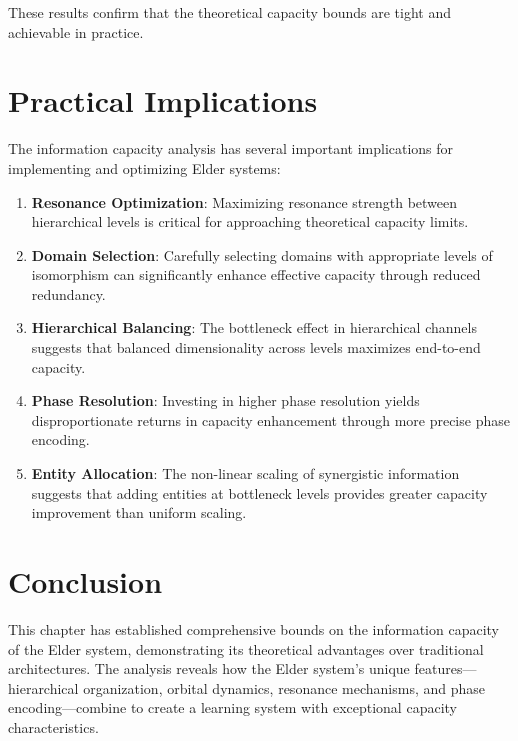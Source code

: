 These results confirm that the theoretical capacity bounds are tight and achievable in practice.

\section{Practical Implications}

The information capacity analysis has several important implications for implementing and optimizing Elder systems:

\begin{enumerate}
    \item \textbf{Resonance Optimization}: Maximizing resonance strength between hierarchical levels is critical for approaching theoretical capacity limits.
    
    \item \textbf{Domain Selection}: Carefully selecting domains with appropriate levels of isomorphism can significantly enhance effective capacity through reduced redundancy.
    
    \item \textbf{Hierarchical Balancing}: The bottleneck effect in hierarchical channels suggests that balanced dimensionality across levels maximizes end-to-end capacity.
    
    \item \textbf{Phase Resolution}: Investing in higher phase resolution yields disproportionate returns in capacity enhancement through more precise phase encoding.
    
    \item \textbf{Entity Allocation}: The non-linear scaling of synergistic information suggests that adding entities at bottleneck levels provides greater capacity improvement than uniform scaling.
\end{enumerate}

\section{Conclusion}

This chapter has established comprehensive bounds on the information capacity of the Elder system, demonstrating its theoretical advantages over traditional architectures. The analysis reveals how the Elder system's unique features—hierarchical organization, orbital dynamics, resonance mechanisms, and phase encoding—combine to create a learning system with exceptional capacity characteristics.

